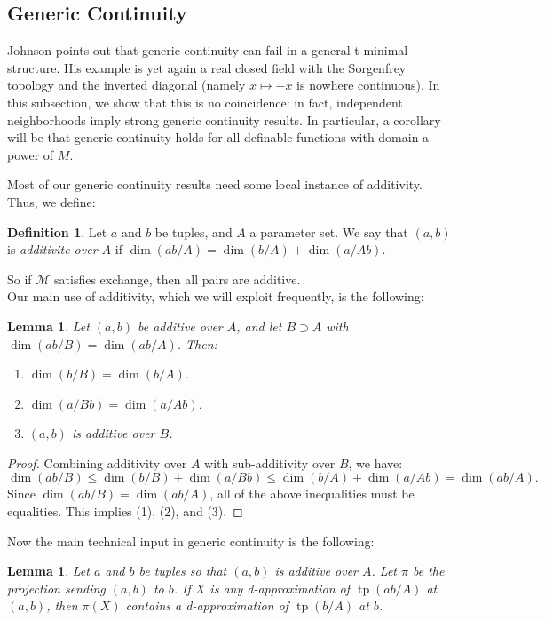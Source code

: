 \documentclass{amsart}
\newtheorem{lemma}[theorem]{Lemma}
\theoremstyle{definition}
\newtheorem{definition}[theorem]{Definition}
\newcommand{\tp}{\operatorname{tp}}
\begin{document}
\subsection{Generic Continuity} Johnson \cite[Remark 1.16]{t-minimal-johnson} points out that generic continuity can fail in a general t-minimal structure. His example is yet again a real closed field with the Sorgenfrey topology and the inverted diagonal (namely $x\mapsto -x$ is nowhere continuous). In this subsection, we show that this is no coincidence: in fact, independent neighborhoods imply strong generic continuity results. In particular, a corollary will be that generic continuity holds for all definable functions with domain a power of $M$.

Most of our generic continuity results need some local instance of additivity. Thus, we define: 

\begin{definition}
    Let $a$ and $b$ be tuples, and $A$ a parameter set. We say that $(a,b)$ is \textit{additivite over $A$} if $\dim(ab/A)=\dim(b/A)+\dim(a/Ab)$.
\end{definition}

So if $\mathcal M$ satisfies exchange, then all pairs are additive.\\

Our main use of additivity, which we will exploit frequently, is the following:

\begin{lemma}\label{L: additive pairs}
    Let $(a,b)$ be additive over $A$, and let $B\supset A$ with $\dim(ab/B)=\dim(ab/A)$. Then:
    \begin{enumerate}
        \item $\dim(b/B)=\dim(b/A)$.
        \item $\dim(a/Bb)=\dim(a/Ab)$.
        \item $(a,b)$ is additive over $B$.
    \end{enumerate}
\end{lemma}
\begin{proof}
    Combining additivity over $A$ with sub-additivity over $B$, we have: 
    $$\dim(ab/B)\leq\dim(b/B)+\dim(a/Bb)\leq\dim(b/A)+\dim(a/Ab)=\dim(ab/A).$$ Since $\dim(ab/B)=\dim(ab/A)$, all of the above inequalities must be equalities. This implies (1), (2), and (3).
\end{proof}

Now the main technical input in generic continuity is the following:

\begin{lemma}\label{L: d-app images}
Let $a$ and $b$ be tuples so that $(a,b)$ is additive over $A$. Let $\pi$ be the projection sending $(a,b)$ to $b$. If $X$ is any d-approximation of $\tp(ab/A)$ at $(a,b)$, then $\pi(X)$ contains a d-approximation of $\tp(b/A)$ at $b$.
\end{lemma}
\end{document}
